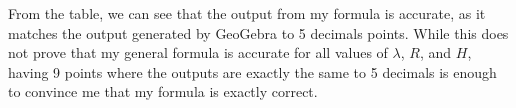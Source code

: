 From the table, we can see that the output from my formula is accurate, as it matches the output generated by GeoGebra to 5 decimals points. While this does not prove that my general formula is accurate for all values of $\lambda$, $R$, and $H$, having 9 points where the outputs are exactly the same to 5 decimals is enough to convince me that my formula is exactly correct. 
